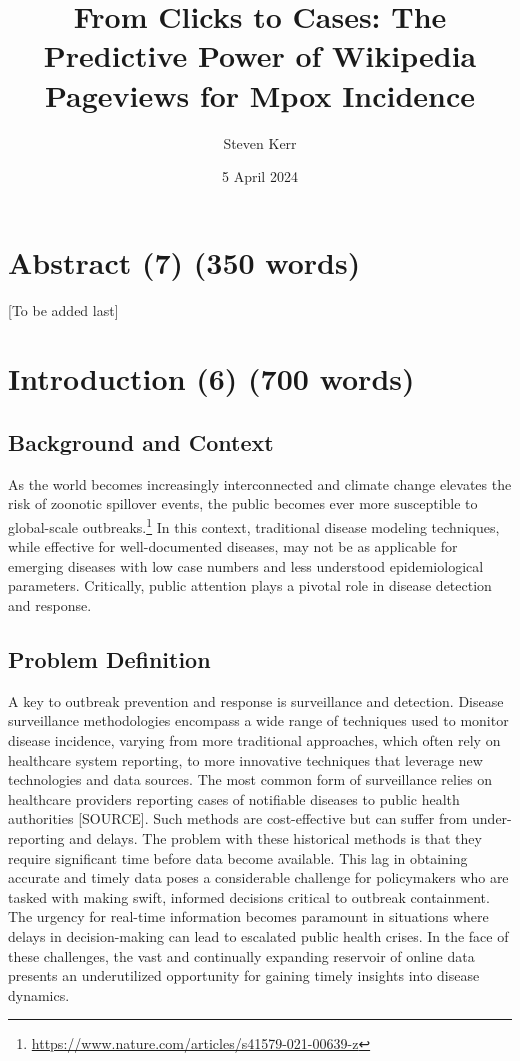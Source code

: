 \documentclass[
  12pt,
]{article}
\title{From Clicks to Cases: The Predictive Power of Wikipedia Pageviews
for Mpox Incidence}
\author{Steven Kerr}
\date{5 April 2024}
\renewcommand*\contentsname{Table of contents}
\newcommand\contentsname{Table of contents}
\begin{document}
\maketitle

\renewcommand*\contentsname{Table of contents}
{
\hypersetup{linkcolor=}
\setcounter{tocdepth}{3}
\tableofcontents
}
\section{Abstract (7) (350 words)}\label{abstract-7-350-words}

{[}To be added last{]}

\section{Introduction (6) (700 words)}\label{introduction-6-700-words}

\subsection{Background and Context}\label{background-and-context}

As the world becomes increasingly interconnected and climate change
elevates the risk of zoonotic spillover events, the public becomes ever
more susceptible to global-scale outbreaks.\footnote{\url{https://www.nature.com/articles/s41579-021-00639-z}}
In this context, traditional disease modeling techniques, while
effective for well-documented diseases, may not be as applicable for
emerging diseases with low case numbers and less understood
epidemiological parameters. Critically, public attention plays a pivotal
role in disease detection and response.

\subsection{Problem Definition}\label{problem-definition}

A key to outbreak prevention and response is surveillance and detection.
Disease surveillance methodologies encompass a wide range of techniques
used to monitor disease incidence, varying from more traditional
approaches, which often rely on healthcare system reporting, to more
innovative techniques that leverage new technologies and data sources.
The most common form of surveillance relies on healthcare providers
reporting cases of notifiable diseases to public health authorities
{[}SOURCE{]}. Such methods are cost-effective but can suffer from
under-reporting and delays. The problem with these historical methods is
that they require significant time before data become available. This
lag in obtaining accurate and timely data poses a considerable challenge
for policymakers who are tasked with making swift, informed decisions
critical to outbreak containment. The urgency for real-time information
becomes paramount in situations where delays in decision-making can lead
to escalated public health crises. In the face of these challenges, the
vast and continually expanding reservoir of online data presents an
underutilized opportunity for gaining timely insights into disease
dynamics.
\end{document}

